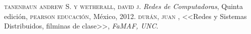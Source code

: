 \documentclass[10pt,a4paper]{report}
\begin{document}
\begin{thebibliography}{X}
 \textsc{tanenbaun andrew S. y wetherall, david j.}
\textit{Redes de Computadoras}, Quinta edición,
\textsc{pearson educación}, México, 2012.
 \textsc{durán, juan },
<<Redes y Sistemas Distribuidos, filminas de clase>>,
\textit{FaMAF, UNC}.
\end{thebibliography}
\end{document}
